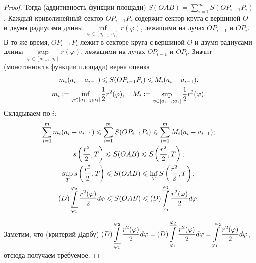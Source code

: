 \begin{proof}
    Тогда (аддитивность функции площади) $S(OAB) = \sum\limits_{i = 1}^mS(OP_{i - 1}P_i)$. Каждый криволинейный сектор $OP_{i - 1}P_i$ содержит сектор круга с вершиной $O$ и двумя радиусами длины $\inf\limits_{\varphi \in [a_{i - 1}; a_i]}r(\varphi)$, лежащими на лучах $OP_{i - 1}$ и $OP_i$. В то же время, $OP_{i - 1}P_i$ лежит в секторе круга с вершиной $O$ и двумя радиусами длины $\sup\limits_{\varphi \in [a_{i - 1}; a_i]}r(\varphi)$, лежащими на лучах $OP_{i - 1}$ и $OP_i$. Значит (монотонность функции площади) верна оценка
    \begin{gather*}
        m_i(a_i - a_{i - 1}) \leqslant S(OP_{i - 1}P_i) \leqslant M_i(a_i - a_{i - 1}),\\
        m_i \vcentcolon = \inf\limits_{\varphi \in [a_{i - 1}; a_i]}\frac{1}{2}r^2(\varphi),\quad M_i \vcentcolon = \sup\limits_{\varphi \in [a_{i - 1}; a_i]}\frac{1}{2}r^2(\varphi).
    \end{gather*}
    Складываем по $i$:
    \begin{gather*}
        \sum_{i = 1}^mm_i(a_i - a_{i - 1}) \leqslant \sum_{i = 1}^mS(OP_{i - 1}P_i) \leqslant \sum_{i = 1}^mM_i(a_i - a_{i - 1});\\
        s\left(\frac{r^2}{2}, T\right) \leqslant S(OAB) \leqslant S\left(\frac{r^2}{2}, T\right);\\
        \sup\limits_Ts\left(\frac{r^2}{2}, T\right) \leqslant S(OAB) \leqslant \inf\limits_TS\left(\frac{r^2}{2}, T\right);\\
        (D)\operatorname*{\underline{\int}}\limits_{\varphi_1}^{\varphi_2}\frac{r^2(\varphi)}{2}d\varphi \leqslant S(OAB) \leqslant (D)\operatorname*{\overline{\int}}\limits_{\varphi_1}^{\varphi_2}\frac{r^2(\varphi)}{2}d\varphi.
    \end{gather*}

    Заметим, что (критерий Дарбу) $\displaystyle(D)\operatorname*{\underline{\int}}\limits_{\varphi_1}^{\varphi_2}\frac{r^2(\varphi)}{2}d\varphi = (D)\operatorname*{\overline{\int}}\limits_{\varphi_1}^{\varphi_2}\frac{r^2(\varphi)}{2}d\varphi = \int\limits_{\varphi_1}^{\varphi_2}\frac{r^2(\varphi)}{2}d\varphi$, отсюда получаем требуемое.
\end{proof}

